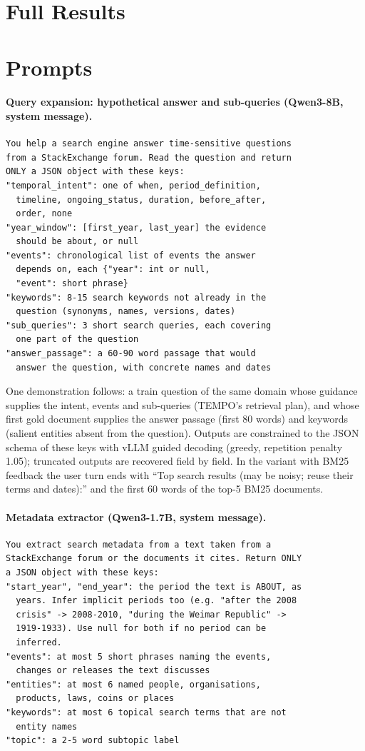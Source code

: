 \section{Full Results}
\label{app:full}


\section{Prompts}
\label{app:prompts}

\paragraph{Query expansion: hypothetical answer and sub-queries (Qwen3-8B, system message).}
{\scriptsize\begin{verbatim}
You help a search engine answer time-sensitive questions
from a StackExchange forum. Read the question and return
ONLY a JSON object with these keys:
"temporal_intent": one of when, period_definition,
  timeline, ongoing_status, duration, before_after,
  order, none
"year_window": [first_year, last_year] the evidence
  should be about, or null
"events": chronological list of events the answer
  depends on, each {"year": int or null,
  "event": short phrase}
"keywords": 8-15 search keywords not already in the
  question (synonyms, names, versions, dates)
"sub_queries": 3 short search queries, each covering
  one part of the question
"answer_passage": a 60-90 word passage that would
  answer the question, with concrete names and dates
\end{verbatim}}
\noindent One demonstration follows: a train question of the same domain whose guidance
supplies the intent, events and sub-queries (TEMPO's retrieval plan), and whose first gold
document supplies the answer passage (first 80 words) and keywords (salient entities absent
from the question). Outputs are constrained to the JSON schema of these keys with vLLM guided
decoding (greedy, repetition penalty 1.05); truncated outputs are recovered field by field.
In the variant with BM25 feedback the user turn ends with ``Top search results (may be noisy; reuse their
terms and dates):'' and the first 60 words of the top-5 BM25 documents.

\paragraph{Metadata extractor (Qwen3-1.7B, system message).}
{\scriptsize\begin{verbatim}
You extract search metadata from a text taken from a
StackExchange forum or the documents it cites. Return ONLY
a JSON object with these keys:
"start_year", "end_year": the period the text is ABOUT, as
  years. Infer implicit periods too (e.g. "after the 2008
  crisis" -> 2008-2010, "during the Weimar Republic" ->
  1919-1933). Use null for both if no period can be
  inferred.
"events": at most 5 short phrases naming the events,
  changes or releases the text discusses
"entities": at most 6 named people, organisations,
  products, laws, coins or places
"keywords": at most 6 topical search terms that are not
  entity names
"topic": a 2-5 word subtopic label
\end{verbatim}}

